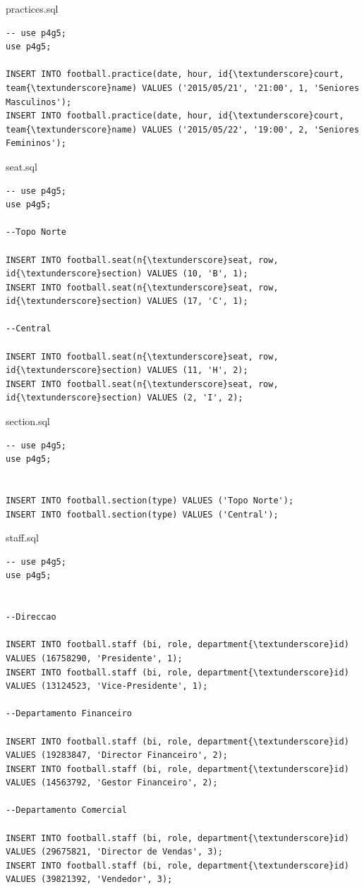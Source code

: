 \documentclass[pdftex,12pt,a4paper]{report}
\begin{document}
practices.sql
\begin{lstlisting} 
-- use p4g5;
use p4g5;

INSERT INTO football.practice(date, hour, id{\textunderscore}court, team{\textunderscore}name) VALUES ('2015/05/21', '21:00', 1, 'Seniores Masculinos');
INSERT INTO football.practice(date, hour, id{\textunderscore}court, team{\textunderscore}name) VALUES ('2015/05/22', '19:00', 2, 'Seniores Femininos');
\end{lstlisting}

seat.sql
\begin{lstlisting} 
-- use p4g5;
use p4g5;

--Topo Norte

INSERT INTO football.seat(n{\textunderscore}seat, row, id{\textunderscore}section) VALUES (10, 'B', 1);
INSERT INTO football.seat(n{\textunderscore}seat, row, id{\textunderscore}section) VALUES (17, 'C', 1);

--Central

INSERT INTO football.seat(n{\textunderscore}seat, row, id{\textunderscore}section) VALUES (11, 'H', 2);
INSERT INTO football.seat(n{\textunderscore}seat, row, id{\textunderscore}section) VALUES (2, 'I', 2);
\end{lstlisting}

section.sql
\begin{lstlisting} 
-- use p4g5;
use p4g5;


INSERT INTO football.section(type) VALUES ('Topo Norte');
INSERT INTO football.section(type) VALUES ('Central');
\end{lstlisting}

staff.sql
\begin{lstlisting} 
-- use p4g5;
use p4g5;


--Direccao

INSERT INTO football.staff (bi, role, department{\textunderscore}id) VALUES (16758290, 'Presidente', 1);
INSERT INTO football.staff (bi, role, department{\textunderscore}id) VALUES (13124523, 'Vice-Presidente', 1);

--Departamento Financeiro

INSERT INTO football.staff (bi, role, department{\textunderscore}id) VALUES (19283847, 'Director Financeiro', 2);
INSERT INTO football.staff (bi, role, department{\textunderscore}id) VALUES (14563792, 'Gestor Financeiro', 2);

--Departamento Comercial

INSERT INTO football.staff (bi, role, department{\textunderscore}id) VALUES (29675821, 'Director de Vendas', 3);
INSERT INTO football.staff (bi, role, department{\textunderscore}id) VALUES (39821392, 'Vendedor', 3);


\end{lstlisting}
\end{document}
